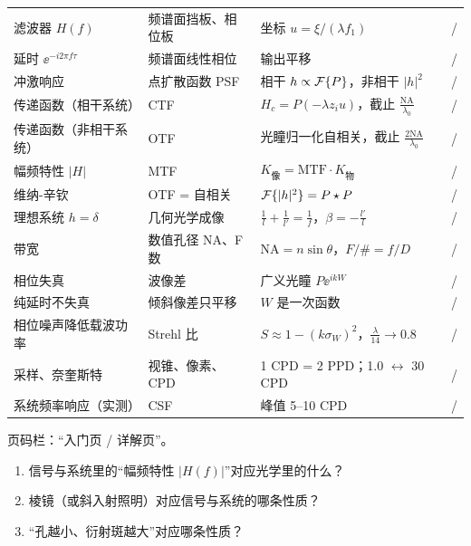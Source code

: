 \begin{center}
\begin{tabular}{@{}P{3.6cm}P{3.9cm}P{6.0cm}P{1.9cm}@{}}
滤波器 $H(f)$ & 频谱面挡板、相位板 & 坐标 $u=\xi/(\lambda f_1)$ & \pageref{sec:p-lensft}/\pageref{sec:4fctf}\\
延时 $\ee^{-i2\pi f\tau}$ & 频谱面线性相位 & 输出平移 & \pageref{sec:p-lensft}/\pageref{sec:linphase}\\
冲激响应 & 点扩散函数 PSF & 相干 $h\propto\mathcal{F}\{P\}$，非相干 $|h|^2$ & \pageref{sec:p-imaging}/\pageref{sec:typeD}\\
传递函数（相干系统） & CTF & $H_c=P(-\lambda z_iu)$，截止 $\frac{\mathrm{NA}}{\lambda_0}$ & \pageref{sec:p-imaging}/\pageref{sec:typeA}\\
传递函数（非相干系统） & OTF & 光瞳归一化自相关，截止 $\frac{2\mathrm{NA}}{\lambda_0}$ & \pageref{sec:p-imaging}/\pageref{sec:typeB}\\
幅频特性 $|H|$ & MTF & $K_{\text{像}}=\mathrm{MTF}\cdot K_{\text{物}}$ & \pageref{sec:p-imaging}/\pageref{sec:typeE}\\
维纳-辛钦 & OTF = 自相关 & $\mathcal{F}\{|h|^2\}=P\star P$ & \pageref{sec:p-imaging}/\pageref{sec:mtfproof}\\
理想系统 $h=\delta$ & 几何光学成像 & $\frac1l+\frac1{l'}=\frac1f$，$\beta=-\frac{l'}{l}$ & \pageref{sec:p-geom}/\pageref{sec:lensimg}\\
带宽 & 数值孔径 NA、F 数 & $\mathrm{NA}=n\sin\theta$，$F/\#=f/D$ & \pageref{sec:p-geom}/\pageref{sec:stops}\\
相位失真 & 波像差 & 广义光瞳 $P\ee^{ikW}$ & \pageref{sec:p-aberr}/\pageref{sec:aberrms}\\
纯延时不失真 & 倾斜像差只平移 & $W$ 是一次函数 & \pageref{sec:p-aberr}/\pageref{sec:mtfproof}\\
相位噪声降低载波功率 & Strehl 比 & $S\approx1-(k\sigma_W)^2$，$\frac{\lambda}{14}\to0.8$ & \pageref{sec:p-aberr}/\pageref{sec:strehl}\\
采样、奈奎斯特 & 视锥、像素、CPD & 1 CPD = 2 PPD；1.0 $\leftrightarrow$ 30 CPD & \pageref{sec:p-eye}/\pageref{sec:cpd}\\
系统频率响应（实测） & CSF & 峰值 5–10 CPD & \pageref{sec:p-eye}/\pageref{sec:mtfcsf}\\
\bottomrule
\end{tabular}
\end{center}
{\small 页码栏：“入门页 / 详解页”。}

\begin{enumerate}[label=\arabic*.]
\item 信号与系统里的“幅频特性 $|H(f)|$”对应光学里的什么？
\item 棱镜（或斜入射照明）对应信号与系统的哪条性质？
\item “孔越小、衍射斑越大”对应哪条性质？
\end{enumerate}

